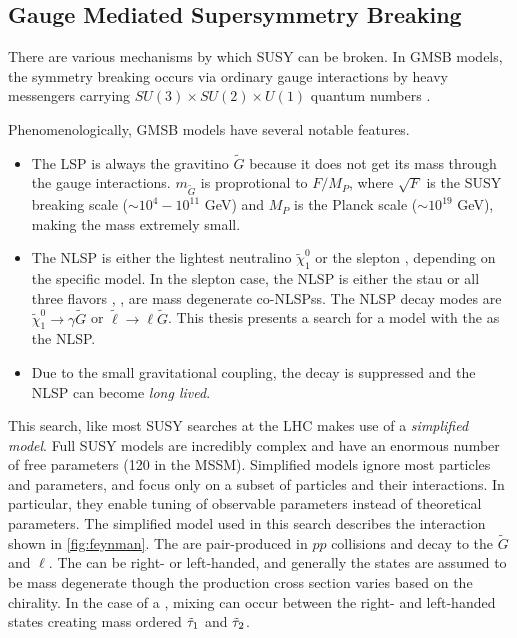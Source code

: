 \subsection{Gauge Mediated Supersymmetry Breaking}
\label{sec:gmsb}

There are various mechanisms by which \ac{SUSY} can be broken. In \acf{GMSB} models, the symmetry breaking occurs via ordinary gauge interactions by heavy messengers carrying $SU(3) \times SU(2) \times U(1)$ quantum numbers \cite{gmsb-lep,Dimopoulos_1996,Ambrosanio_1997}. 



Phenomenologically, \ac{GMSB} models have several notable features. 
\begin{itemize}
	\item The \ac{LSP} is always the gravitino $\tilde{G}$ because it does not get its mass through the gauge interactions. $m_{\tilde{G}}$ is proprotional to $F/M_P$, where $\sqrt{F}$ is the \ac{SUSY} breaking scale ($\sim 10^4 - 10^{11}$ GeV) and $M_P$ is the Planck scale ($\sim 10^{19}$ GeV), making the mass extremely small.

	\item The \ac{NLSP} is either the lightest neutralino $\tilde{\chi}^0_1$ or the slepton \slep, depending on the specific model. In the slepton case, the \ac{NLSP} is either the stau \stau or all three flavors \selec, \smu, \stau are mass degenerate co-\acp{NLSP}s. The \ac{NLSP} decay modes are $\tilde{\chi}^0_1 \rightarrow \gamma \tilde{G}$ or $\tilde{\ell} \rightarrow \ell \tilde{G}$. This thesis presents a search for a model with the \slep as the \ac{NLSP}. 

	\item Due to the small gravitational coupling, the decay is suppressed and the \ac{NLSP} can become \emph{long lived}. 
\end{itemize}

This search, like most \ac{SUSY} searches at the \ac{LHC} makes use of a \emph{simplified model}.
Full \ac{SUSY} models are incredibly complex and have an enormous number of free parameters (120 in the \ac{MSSM}). Simplified models ignore most particles and parameters, and focus only on a subset of particles and their interactions. In particular, they enable tuning of observable parameters instead of theoretical parameters. The simplified model used in this search describes the interaction shown in \autoref{fig:feynman}. The \slep are pair-produced in $pp$ collisions and decay to the $\tilde{G}$ and $\ell$. The \slep can be right- or left-handed, and generally the states are assumed to be mass degenerate though the production cross section varies based on the chirality. In the case of a \stau, mixing can occur between the right- and left-handed states creating mass ordered $\tilde{\tau}_1$ and $\tilde{\tau}_2$.

